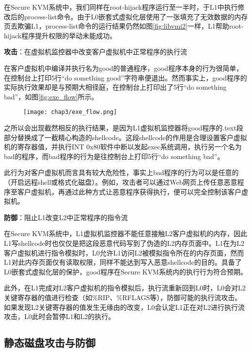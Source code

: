 在Secure KVM系统中，我们同样在root-hijack程序运行至一半时，于L1中执行修改后的process-list命令。由于L0嵌套式虚拟化层使用了一张填充了无效数据的内存页去欺骗L1，process-list命令的运行结果仍然如图\ref{fig:libvmi2}一样，L1帮助root-hijack程序提升权限的举动未能成功。

\noindent
\textbf{攻击\uppercase\expandafter{}}：在虚拟机监控器中改变客户虚拟机中正常程序的执行流

在客户虚拟机中编译并执行名为good的普通程序，good程序本身的行为很简单，在控制台上打印5行``do something good''字符串便退出。然而事实上，good程序的实际执行效果却是与预期大相径庭，在控制台上打印出了5行``do something bad''，如图\ref{fig:exe_flow}所示。

\begin{figure}[!htbp]
  \centering
  \texttt{[image: chap3/exe\_flow.png]}
\end{figure}

之所以会出现截然相反的执行结果，是因为L1虚拟机监控器将good程序的.text段部分替换成了一截精心构造的shellcode\cite{shellcode}。这段shellcode的作用是合理设置客户虚拟机的寄存器值，并执行INT 0x80软件中断以发起exec系统调用，执行另一个名为bad的程序，而bad程序的行为是往控制台上打印5行``do something bad''。

此行为对客户虚拟机而言具有较大危险性，事实上bad程序的行为可以是任意的（开启远程shell或格式化磁盘）。例如，攻击者可以通过Web网页上传任意恶意程序至客户虚拟机，再通过此种方式让恶意程序获得执行，便可以完全控制该客户虚拟机。

\noindent
\textbf{防御\uppercase\expandafter{}}：阻止L1改变L2中正常程序的指令流

在Secure KVM系统中，L1虚拟机监控器不能任意接触L2客户虚拟机的内存，因此L1写shellcode时也仅仅是把这段恶意代码写到了伪造的L2内存页面中。L1在为L2客户虚拟机进行指令模拟时，L0允许L1访问L2被模拟指令所在的内存页面，然而L1对此内存页面仅有读取权限，同样不能达到写入恶意shellcode的目的。具备了L0嵌套式虚拟化层的保护，good程序在Secure KVM系统内的执行行为符合预期。

此外，在L1完成对L2客户虚拟机的指令模拟后，执行流重新回到L0时，L0会对L2关键寄存器的值进行检查（如\%RIP、\%RFLAGS等），防御可能的执行流攻击。如果发现L2关键寄存器的值发生无缘由的改变，L0会认定L1正在对L2进行执行流攻击，L0此时会暂停L1和L2的执行。

\subsection{静态磁盘攻击与防御}

